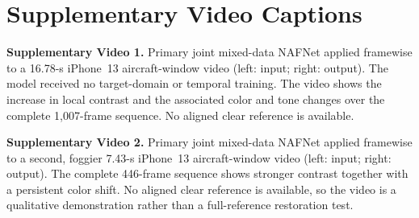 \documentclass[9pt]{osa-supplemental-document}
\begin{document}
\section*{Supplementary Video Captions}

\textbf{Supplementary Video 1.} Primary joint mixed-data NAFNet
applied framewise to a 16.78-s iPhone~13 aircraft-window video
(left: input; right: output). The model received no target-domain or
temporal training. The video shows the increase in local contrast and
the associated color and tone changes over the complete 1{,}007-frame
sequence. No aligned clear reference is available.

\textbf{Supplementary Video 2.} Primary joint mixed-data NAFNet
applied framewise to a second, foggier 7.43-s iPhone~13
aircraft-window video (left: input; right: output). The complete
446-frame sequence shows stronger contrast together with a persistent
color shift. No aligned clear reference is available, so the video is
a qualitative demonstration rather than a full-reference restoration
test.


\end{document}
